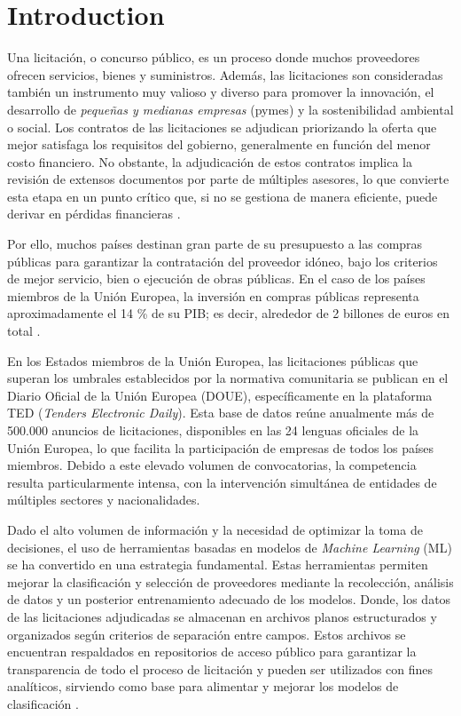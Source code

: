 \documentclass[a4paper,fleqn]{cas-sc}
\begin{document}
\maketitle

\section{Introduction}
\label{sec:introduction}


Una licitación, o concurso público, es un proceso donde muchos proveedores ofrecen servicios, bienes y suministros. Además, las licitaciones son consideradas también  un instrumento muy valioso y diverso para  promover la innovación, el desarrollo de \textit{pequeñas y medianas empresas} (pymes) y la sostenibilidad ambiental o social. Los contratos de las licitaciones se adjudican priorizando la oferta que mejor satisfaga los requisitos del gobierno, generalmente en función del menor costo financiero. No obstante, la adjudicación de estos contratos implica la revisión de extensos documentos por parte de múltiples asesores, lo que  convierte esta etapa en un punto crítico que, si no se gestiona de manera eficiente,  puede derivar en  pérdidas financieras \cite{IsabelGallego2021,Hoekman2024}. 

Por ello, muchos países destinan gran parte de su presupuesto a las compras públicas para garantizar la contratación del proveedor idóneo, bajo los criterios de mejor servicio, bien o ejecución de obras públicas. En el caso de los  países miembros de la Unión Europea, la inversión en compras públicas representa aproximadamente el 14 \% de su  PIB; es decir, alrededor de 2 billones de euros en total \cite{garciarodriguez2022}.  

	En los Estados miembros de la Unión Europea, las licitaciones públicas que superan los umbrales establecidos por la normativa comunitaria se publican en el Diario Oficial de la Unión Europea (DOUE), específicamente en la plataforma TED (\textit{Tenders Electronic Daily}). Esta base de datos reúne anualmente más de 500.000 anuncios de licitaciones, disponibles en las 24 lenguas oficiales de la Unión Europea, lo que facilita la participación de empresas de todos los países miembros. Debido a este elevado volumen de convocatorias, la competencia resulta particularmente intensa, con la intervención simultánea de entidades de múltiples sectores y nacionalidades.

Dado el alto volumen de información y la necesidad de optimizar la toma de decisiones, el uso de herramientas basadas en modelos de \textit{Machine Learning} (ML) se ha convertido en una estrategia fundamental.
Estas herramientas permiten mejorar la clasificación y selección de proveedores mediante la recolección,  análisis de datos y un posterior entrenamiento adecuado de los modelos. 
%
Donde, los datos de las licitaciones adjudicadas se almacenan en archivos planos estructurados y organizados según criterios de separación entre campos. Estos archivos se encuentran respaldados en repositorios de acceso público para garantizar la transparencia de todo el proceso de licitación y pueden ser utilizados con fines analíticos, sirviendo como base para alimentar y mejorar los modelos de clasificación \cite{IsabelGallego2021}. 
\end{document}
